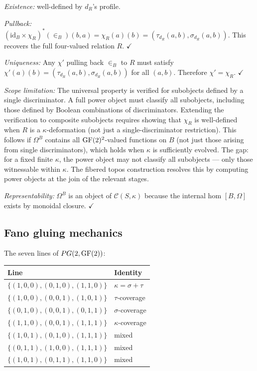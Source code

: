 \emph{Existence:} well-defined by $d_R$'s profile.

\emph{Pullback:}
$(\mathrm{id}_B \times \chi_R)^*(\in_B)(b,a)
= \chi_R(a)(b) = (\tau_{d_R}(a,b), \sigma_{d_R}(a,b))$.
This recovers the full four-valued relation $R$.
$\checkmark$

\emph{Uniqueness:}
Any $\chi'$ pulling back $\in_B$ to $R$ must satisfy
$\chi'(a)(b) = (\tau_{d_R}(a,b), \sigma_{d_R}(a,b))$
for all $(a,b)$. Therefore $\chi' = \chi_R$. $\checkmark$

\emph{Scope limitation:}
The universal property is verified for subobjects defined
by a single discriminator. A full power object must
classify all subobjects, including those defined by
Boolean combinations of discriminators. Extending the
verification to composite subobjects requires showing
that $\chi_R$ is well-defined when $R$ is a
$\kappa$-deformation (not just a single-discriminator
restriction). This follows if $\Omega^B$ contains all
$\operatorname{GF}(2)^2$-valued functions on $B$ (not just those
arising from single discriminators), which holds when
$\kappa$ is sufficiently evolved. The gap: for a fixed
finite $\kappa$, the power object may not classify all
subobjects --- only those witnessable within $\kappa$.
The fibered topos construction resolves this by
computing power objects at the join of the relevant
stages.

\emph{Representability:}
$\Omega^B$ is an object of $\mathcal{C}(S,\kappa)$
because the internal hom $[B, \Omega]$ exists by monoidal
closure. $\checkmark$

\subsection{Fano gluing mechanics}
\label{app:fano-gluing}

The seven lines of $PG(2, \operatorname{GF}(2))$:
\begin{center}
\small
\begin{tabular}{l|l}
Line & Identity \\
\hline
$\{(1,0,0), (0,1,0), (1,1,0)\}$ &
  $\kappa = \sigma + \tau$ \\
$\{(1,0,0), (0,0,1), (1,0,1)\}$ &
  $\tau$-coverage \\
$\{(0,1,0), (0,0,1), (0,1,1)\}$ &
  $\sigma$-coverage \\
$\{(1,1,0), (0,0,1), (1,1,1)\}$ &
  $\kappa$-coverage \\
$\{(1,0,1), (0,1,0), (1,1,1)\}$ &
  mixed \\
$\{(0,1,1), (1,0,0), (1,1,1)\}$ &
  mixed \\
$\{(1,0,1), (0,1,1), (1,1,0)\}$ &
  mixed
\end{tabular}
\end{center}

